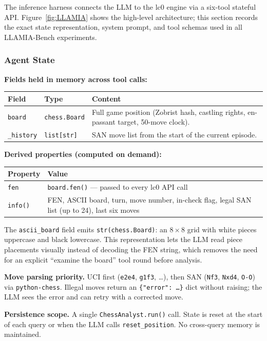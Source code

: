 \medskip
The inference harness connects the LLM to the lc0 engine via a six-tool
stateful API.  Figure~\ref{fig:LLAMIA} shows the high-level architecture;
this section records the exact state representation, system prompt, and tool
schemas used in all LLAMIA-Bench experiments.

\subsubsection{Agent State}
\label{app:details:agent:state}

\begin{tcolorbox}[statebox, title={Agent State \textnormal{(\texttt{agents/state.py} — \texttt{ChessState})}},
  label={box:agentstate}]

\textbf{\textsf{Fields held in memory across tool calls:}}

\smallskip
\begin{tabular}{@{}lp{2.5cm}p{8.4cm}@{}}
  \toprule
  \textbf{Field} & \textbf{Type} & \textbf{Content} \\
  \midrule
  \texttt{board} & \texttt{chess.Board} & Full game position (Zobrist hash, castling rights, en-passant target, 50-move clock). \\
  \texttt{\_history} & \texttt{list[str]} & SAN move list from the start of the current episode. \\
  \bottomrule
\end{tabular}

\medskip
\textbf{\textsf{Derived properties (computed on demand):}}

\smallskip
\begin{tabular}{@{}lp{10.5cm}@{}}
  \toprule
  \textbf{Property} & \textbf{Value} \\
  \midrule
  \texttt{fen} & \texttt{board.fen()} --- passed to every lc0 API call \\
  \texttt{info()} & FEN, ASCII board, turn, move number, in-check flag, legal SAN list (up to 24), last six moves \\
  \bottomrule
\end{tabular}

\smallskip
\noindent The \texttt{ascii\_board} field emits \texttt{str(chess.Board)}: an
8\,$\times$\,8 grid with white pieces uppercase and black lowercase.  This
representation lets the LLM read piece placements visually instead of
decoding the FEN string, which removes the need for an explicit
``examine the board'' tool round before analysis.

\medskip
\textbf{\textsf{Move parsing priority.}} UCI first (\texttt{e2e4},
\texttt{g1f3}, \ldots), then SAN (\texttt{Nf3}, \texttt{Nxd4},
\texttt{O\nobreakdash-O}) via \texttt{python-chess}.  Illegal moves return
an \texttt{\{"error": \ldots\}} dict without raising; the LLM sees the
error and can retry with a corrected move.

\smallskip
\textbf{\textsf{Persistence scope.}} A single \texttt{ChessAnalyst.run()}
call.  State is reset at the start of each query or when the LLM calls
\texttt{reset\_position}.  No cross-query memory is maintained.
\end{tcolorbox}


